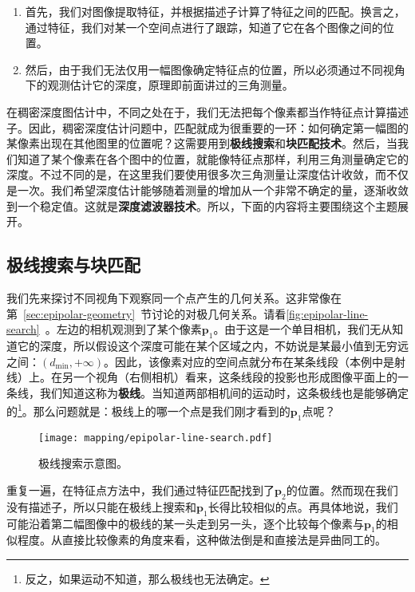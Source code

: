 \begin{enumerate}
	\item 首先，我们对图像提取特征，并根据描述子计算了特征之间的匹配。换言之，通过特征，我们对某一个空间点进行了跟踪，知道了它在各个图像之间的位置。
	\item 然后，由于我们无法仅用一幅图像确定特征点的位置，所以必须通过不同视角下的观测估计它的深度，原理即前面讲过的三角测量。
\end{enumerate}

在稠密深度图估计中，不同之处在于，我们无法把每个像素都当作特征点计算描述子。因此，稠密深度估计问题中，匹配就成为很重要的一环：如何确定第一幅图的某像素出现在其他图里的位置呢？这需要用到\textbf{极线搜索}和\textbf{块匹配技术}\textsuperscript{\cite{Pizzoli2014}}。然后，当我们知道了某个像素在各个图中的位置，就能像特征点那样，利用三角测量确定它的深度。不过不同的是，在这里我们要使用很多次三角测量让深度估计收敛，而不仅是一次。我们希望深度估计能够随着测量的增加从一个非常不确定的量，逐渐收敛到一个稳定值。这就是\textbf{深度滤波器技术}。所以，下面的内容将主要围绕这个主题展开。

\subsection{极线搜索与块匹配}

我们先来探讨不同视角下观察同一个点产生的几何关系。这非常像在第~\ref{sec:epipolar-geometry}~节讨论的对极几何关系。请看\autoref{fig:epipolar-line-search}~。左边的相机观测到了某个像素$\bm{p}_1$。由于这是一个单目相机，我们无从知道它的深度，所以假设这个深度可能在某个区域之内，不妨说是某最小值到无穷远之间：$(d_\mathrm{min}, +\infty)$。因此，该像素对应的空间点就分布在某条线段（本例中是射线）上。在另一个视角（右侧相机）看来，这条线段的投影也形成图像平面上的一条线，我们知道这称为\textbf{极线}。当知道两部相机间的运动时，这条极线也是能够确定的\footnote{反之，如果运动不知道，那么极线也无法确定。}。那么问题就是：极线上的哪一个点是我们刚才看到的$\bm{p}_1$点呢？

\begin{figure}[!htp]
	\centering
	\texttt{[image: mapping/epipolar-line-search.pdf]}
	\caption{极线搜索示意图。}
	\label{fig:epipolar-line-search}
\end{figure}

重复一遍，在特征点方法中，我们通过特征匹配找到了$\bm{p}_2$的位置。然而现在我们没有描述子，所以只能在极线上搜索和$\bm{p}_1$长得比较相似的点。再具体地说，我们可能沿着第二幅图像中的极线的某一头走到另一头，逐个比较每个像素与$\bm{p}_1$的相似程度。从直接比较像素的角度来看，这种做法倒是和直接法是异曲同工的。

